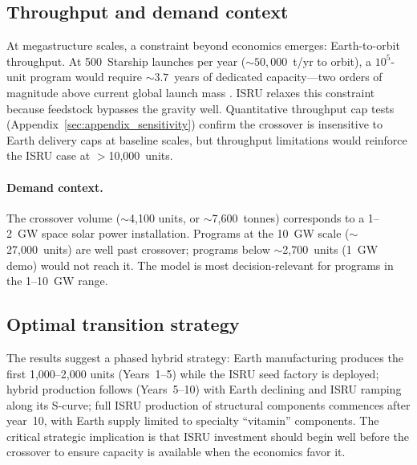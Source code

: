 \documentclass[preprint,12pt]{elsarticle}
\begin{document}
\subsection{Throughput and demand context}
\label{sec:throughput}

At megastructure scales, a constraint beyond economics emerges: Earth-to-orbit throughput. At 500~Starship launches per year (${\sim}50{,}000$~t/yr to orbit), a $10^5$-unit program would require ${\sim}3.7$~years of dedicated capacity---two orders of magnitude above current global launch mass \cite{jones2022}. ISRU relaxes this constraint because feedstock bypasses the gravity well. Quantitative throughput cap tests (Appendix~\ref{sec:appendix_sensitivity}) confirm the crossover is insensitive to Earth delivery caps at baseline scales, but throughput limitations would reinforce the ISRU case at $>$10{,}000~units.

\paragraph{Demand context.} The crossover volume ($\sim$4,100 units, or $\sim$7,600~tonnes) corresponds to a 1--2~GW space solar power installation. Programs at the 10~GW scale ($\sim$27,000~units) are well past crossover; programs below $\sim$2,700~units (1~GW demo) would not reach it. The model is most decision-relevant for programs in the 1--10~GW range.

\subsection{Optimal transition strategy}

The results suggest a phased hybrid strategy: Earth manufacturing produces the first 1{,}000--2{,}000 units (Years~1--5) while the ISRU seed factory is deployed; hybrid production follows (Years~5--10) with Earth declining and ISRU ramping along its S-curve; full ISRU production of structural components commences after year~10, with Earth supply limited to specialty ``vitamin'' components. The critical strategic implication is that ISRU investment should begin well before the crossover to ensure capacity is available when the economics favor it.
\end{document}
